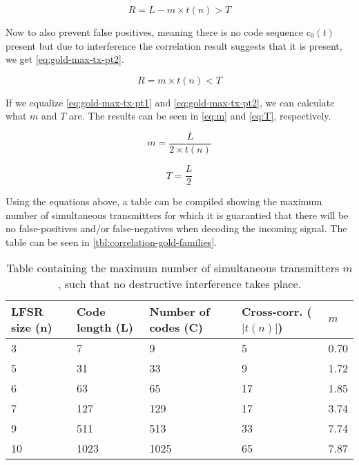 \begin{equation}
	\label{eq:gold-max-tx-pt1}
	R = L - m \times t(n) > T
\end{equation}

Now to also prevent false positives, meaning there is no code sequence $c_0(t)$ present but due to interference the correlation result suggests that it is present, we get \autoref{eq:gold-max-tx-pt2}.


\begin{equation}
	\label{eq:gold-max-tx-pt2}
	R = m \times t(n) < T
\end{equation}

If we equalize \autoref{eq:gold-max-tx-pt1} and \autoref{eq:gold-max-tx-pt2}, we can calculate what $m$ and $T$ are.
The results can be seen in \autoref{eq:m} and \autoref{eq:T}, respectively.


\begin{equation}
	\label{eq:m}
	m = \frac{L}{2 \times t(n)}
\end{equation}

\begin{equation}
	\label{eq:T}
	T = \frac{L}{2}
\end{equation}


Using the equations above, a table can be compiled showing the maximum number of simultaneous transmitters for which it is guarantied that there will be no false-positives and/or false-negatives when decoding the incoming signal.
The table can be seen in \autoref{tbl:correlation-gold-families}.



\begin{table}[h]
	\centering
	\begin{tabular}{ | l | l | l | l | l |  }

		\hline
		LFSR size (n) 	& Code length (L)	& Number of codes (C)	& Cross-corr. ($|t(n)|$) 	& $m$	\\ \hline

		3				& 7					& 9						& 5							& 0.70	\\ \hline
		5				& 31				& 33					& 9							& 1.72	\\ \hline
		6				& 63				& 65					& 17						& 1.85	\\ \hline
		7				& 127				& 129					& 17						& 3.74	\\ \hline
		9				& 511				& 513					& 33						& 7.74	\\ \hline%
		10				& 1023				& 1025					& 65						& 7.87	\\ \hline	%

	\end{tabular}
	\caption{Table containing the maximum number of simultaneous transmitters $m$, such that no destructive interference takes place.}
	\label{tbl:correlation-gold-families}
\end{table}



